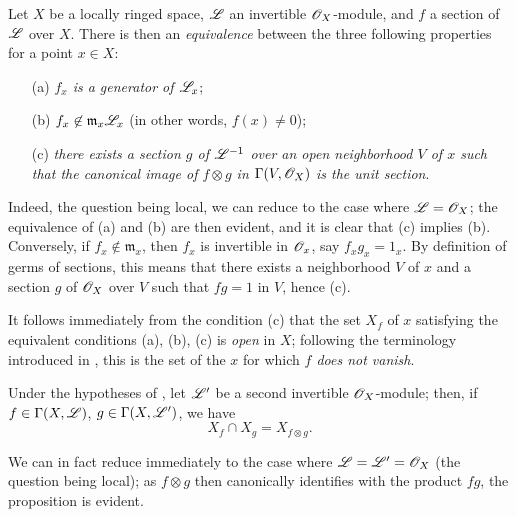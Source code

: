 \begin{env}[5.5.2]
\label{0.5.5.2}
Let $X$ be a locally ringed space, $\mathscr{L}$ an invertible $\mathscr{O}_X$-module, and $f$ a section of $\mathscr{L}$ over $X$.
There is then an \emph{equivalence} between the three following properties for a point $x\in X$:
\begin{enumerate}
  \item[(a)] \emph{$f_x$ is a generator of $\mathscr{L}_x$};
  \item[(b)] \emph{$f_x\not\in\mathfrak{m}_x\mathscr{L}_x$} (in other words, $f(x)\neq 0$);
  \item[(c)] \emph{there exists a section $g$ of $\mathscr{L}^{-1}$ over an open neighborhood $V$ of $x$ such that the canonical image of $f\otimes g$ in $\Gamma(V,\mathscr{O}_X)$  is the unit section}.
\end{enumerate}

Indeed, the question being local, we can reduce to the case where $\mathscr{L}=\mathscr{O}_X$;
the equivalence of (a) and (b) are then evident, and it is clear that (c) implies (b).
Conversely, if $f_x\not\in\mathfrak{m}_x$, then $f_x$ is invertible in $\mathscr{O}_x$, say $f_x g_x=1_x$.
By definition of germs of sections, this means that there exists a neighborhood $V$ of $x$ and a section $g$ of $\mathscr{O}_X$ over $V$ such that $fg=1$ in $V$, hence (c).

It follows immediately from the condition (c) that the set $X_f$ of $x$ satisfying the equivalent conditions (a), (b), (c) is \emph{open} in $X$;
following the terminology introduced in , this is the set of the $x$ for which \emph{$f$ does not vanish}.
\end{env}

\begin{env}[5.5.3]
\label{0.5.5.3}
Under the hypotheses of , let $\mathscr{L}'$ be a second invertible $\mathscr{O}_X$-module;
then, if $f\in\Gamma(X,\mathscr{L})$, $g\in\Gamma(X,\mathscr{L}')$, we have
\[
  X_f\cap X_g=X_{f\otimes g}.
\]

We can in fact reduce immediately to the case where $\mathscr{L}=\mathscr{L}'=\mathscr{O}_X$ (the question being local);
as $f\otimes g$ then canonically identifies with the product $fg$, the proposition is evident.
\end{env}

